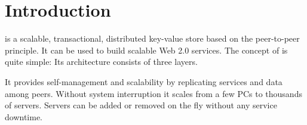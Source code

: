 \chapter{Introduction}

\scalaris{} is a scalable, transactional, distributed key-value store based
on the peer-to-peer principle. It can be used to build scalable Web 2.0
services. The concept of \scalaris{} is quite simple: Its architecture
consists of three layers.

It provides self-management and scalability by replicating services and data
among peers. Without system interruption it scales from a few PCs to
thousands of servers. Servers can be added or removed on the fly without any
service downtime.

